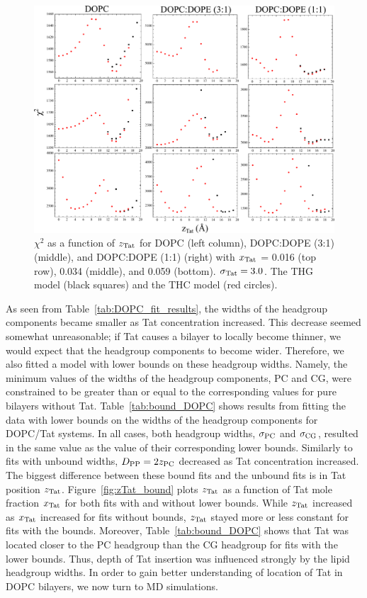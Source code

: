 \begin{figure}[htbp]
  \centering
  \includegraphics[width=\textwidth]{figures/Tat/SDP_Results/X2/X2}
  \caption{$\chi^2$ as a function of $z_\textrm{Tat}$ for DOPC (left column), 
  DOPC:DOPE (3:1) (middle), and DOPC:DOPE (1:1) (right) 
  with $x_\textrm{Tat}$ = 0.016 (top row), 0.034 (middle), and 0.059 (bottom). 
  $\sigma_\textrm{Tat} = 3.0$. The THG model (black squares) and the THC model (red circles).}
  \label{fig:DOPC_Tat_X2}
\end{figure}

As seen from Table~\ref{tab:DOPC_fit_results}, 
the widths of the headgroup components
became smaller as Tat concentration increased. This
decrease seemed somewhat unreasonable; if Tat causes a bilayer 
to locally become thinner, 
we would expect that the headgroup components to become
wider. Therefore, we also fitted a model with lower bounds
on these headgroup widths. Namely, the minimum values of the widths of
the headgroup components, PC and CG, were constrained to be greater than
or equal to the corresponding values for pure bilayers without Tat. 
Table~\ref{tab:bound_DOPC} shows results from fitting the data with
lower bounds on the widths of the headgroup components for DOPC/Tat systems.
In all cases, both headgroup widths, $\sigma_\textrm{PC}$ and $\sigma_\textrm{CG}$, resulted 
in the same value as the value of their corresponding lower bounds. 
Similarly to fits with unbound widths, $D_\textrm{PP}=2z_\textrm{PC}$ decreased as Tat concentration
increased. The biggest difference between these bound fits and the unbound fits
is in Tat position $z_\textrm{Tat}$. Figure~\ref{fig:zTat_bound} plots $z_\textrm{Tat}$ as a function
of Tat mole fraction $x_\textrm{Tat}$ for both fits with and without lower bounds.
While $z_\textrm{Tat}$ increased as $x_\textrm{Tat}$ increased for fits without bounds, $z_\textrm{Tat}$
stayed more or less constant for fits with the bounds. Moreover, 
Table~\ref{tab:bound_DOPC} shows that 
Tat was located closer to the PC headgroup than the CG headgroup
for fits with the lower bounds. Thus,
depth of Tat insertion was influenced strongly by the lipid headgroup widths.
In order to gain better understanding of location of Tat in DOPC bilayers,
we now turn to MD simulations.

